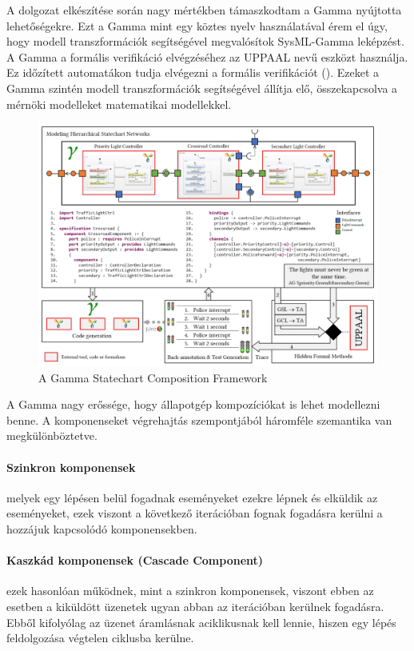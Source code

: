 A dolgozat elkészítése során nagy mértékben támaszkodtam a Gamma nyújtotta lehetőségekre. Ezt a Gamma mint egy köztes nyelv használatával érem el úgy, hogy modell transzformációk segítségével megvalósítok SysML-Gamma leképzést. A Gamma a formális verifikáció elvégzéséhez az UPPAAL nevű eszközt használja. Ez időzített automatákon tudja elvégezni a formális verifikációt (). Ezeket a Gamma szintén modell transzformációk segítségével állítja elő, összekapcsolva a mérnöki modelleket matematikai modellekkel.
\begin{figure}[!ht]
	\centering
	\includegraphics[width=140mm, keepaspectratio]{figures/preliminaries/gamma.png}
	\caption[]{A Gamma Statechart Composition Framework\footnotemark}
	\label{fig:gamma}
\end{figure}
\newpage
A Gamma nagy erőssége, hogy állapotgép kompozíciókat is lehet modellezni benne. A komponenseket végrehajtás szempontjából háromféle szemantika van megkülönböztetve.

\paragraph{Szinkron komponensek} melyek egy lépésen belül fogadnak eseményeket ezekre lépnek és elküldik az eseményeket, ezek viszont a következő iterációban fognak fogadásra kerülni a hozzájuk kapcsolódó komponensekben.

\paragraph{Kaszkád komponensek (Cascade Component)} ezek hasonlóan működnek, mint a szinkron komponensek, viszont ebben az esetben a kiküldött üzenetek ugyan abban az iterációban kerülnek fogadásra. Ebből kifolyólag az üzenet áramlásnak aciklikusnak kell lennie, hiszen egy lépés feldolgozása végtelen ciklusba kerülne.

